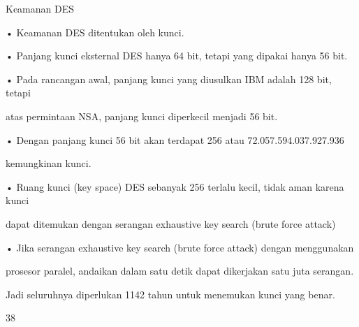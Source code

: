 \documentclass{article}
\begin{document}

Keamanan DES

• Keamanan DES ditentukan oleh kunci.

• Panjang kunci eksternal DES hanya 64 bit, tetapi  yang dipakai hanya 56 bit. 

• Pada rancangan awal, panjang kunci yang diusulkan IBM adalah 128 bit, tetapi 

atas permintaan NSA, panjang kunci diperkecil  menjadi 56 bit. 

• Dengan panjang kunci 56 bit akan terdapat 256 atau 72.057.594.037.927.936 

kemungkinan kunci. 

• Ruang kunci (key space) DES sebanyak 256 terlalu kecil, tidak aman karena kunci 

dapat ditemukan dengan serangan exhaustive key search (brute force attack) 

• Jika serangan exhaustive key search (brute force attack) dengan menggunakan 

prosesor paralel, andaikan dalam satu detik dapat dikerjakan satu juta serangan. 

Jadi  seluruhnya diperlukan 1142 tahun untuk menemukan kunci yang benar.

38
\end{document}
